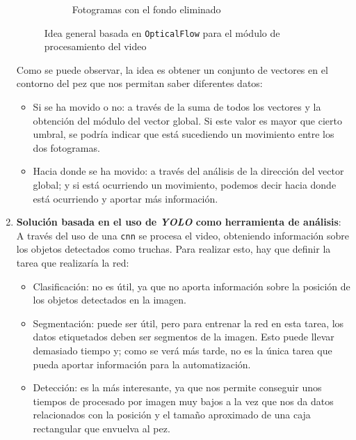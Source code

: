 \begin{enumerate}
\begin{figure}[H]
\begin{subfigure}[b]{\textwidth}
\begin{subfigure}[b]{0.25\textwidth}
                    \label{fig:Opt4}
                \end{subfigure}
                \caption{Fotogramas con el fondo eliminado}
                \label{fig:FotogramasSalidaOF}
            \end{subfigure}
    \caption{Idea general basada en \texttt{OpticalFlow} para el módulo de procesamiento del video}
    \label{fig:IdeaOF}
    \end{figure}

    Como se puede observar, la idea es obtener un conjunto de vectores en el contorno del pez que nos permitan 
    saber diferentes datos:
    \begin{itemize}
        \item Si se ha movido o no: a través de la suma de todos los vectores y la obtención del 
        módulo del vector global. Si este valor es mayor que cierto umbral, se podría indicar que está sucediendo 
        un movimiento entre los dos fotogramas.
        \item Hacia donde se ha movido: a través del análisis de la dirección del vector global; y si está ocurriendo 
        un movimiento, podemos decir hacia donde está ocurriendo y aportar más información.
    \end{itemize}

    \item \textbf{Solución basada en el uso de \textit{YOLO} como herramienta de análisis}: A través del uso de una \texttt{\acrshort{cnn}} 
    se procesa el video, obteniendo información sobre los objetos detectados como truchas.\newline
    Para realizar esto, hay que definir la tarea que realizaría la red:
    \begin{itemize}
        \item Clasificación: no es útil, ya que no aporta información sobre la posición de los objetos detectados en la imagen.
        \item Segmentación: puede ser útil, pero para entrenar la red en esta tarea, los datos etiquetados deben ser segmentos de la imagen. 
        Esto puede llevar demasiado tiempo y; como se verá más tarde, no es la única tarea que pueda aportar información para la automatización.
        \item Detección: es la más interesante, ya que nos permite conseguir unos tiempos de procesado por imagen muy bajos a la vez que nos da datos 
        relacionados con la posición y el tamaño aproximado de una caja rectangular que envuelva al pez.
    \end{itemize}
    

\end{enumerate}
